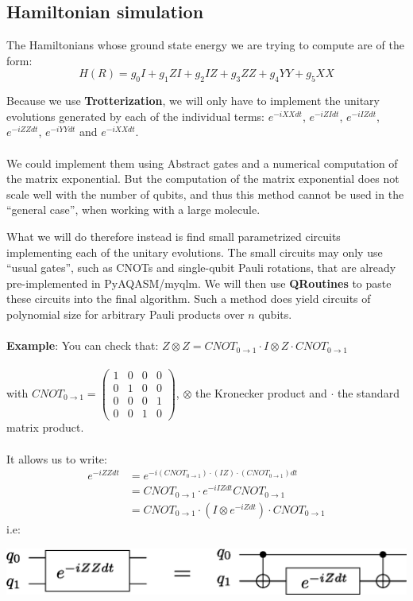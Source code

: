 \documentclass{article}
\begin{document}
\subsection{Hamiltonian simulation}

The Hamiltonians whose ground state energy we are trying to compute are of the form: 
$$H(R) = g_{0}I+g_{1}ZI+g_{2}IZ+g_{3}ZZ+g_{4}YY+g_{5}XX $$

Because we use \textbf{Trotterization}, we will only have
to implement the unitary evolutions generated by each of the
individual terms: $e^{-iXXdt}$, $e^{-iZIdt}$, 
$e^{-iIZdt}$, $e^{-iZZdt}$, $e^{-iYYdt}$ and $e^{-iXXdt}$.

\paragraph{}
We could implement them using Abstract gates and a numerical
computation of the matrix exponential. But the computation of the
matrix exponential does not scale well with the number of qubits, 
and thus this method cannot be used in the ``general case'', when
working with a large molecule.

What we will do therefore instead is find small parametrized circuits 
implementing each of the unitary evolutions. The small circuits
may only use ``usual gates'', such as CNOTs and single-qubit Pauli
rotations, that are already pre-implemented in PyAQASM/myqlm.
We will then use \textbf{QRoutines} to paste these circuits into
the final algorithm. Such a method does yield circuits of polynomial
size for arbitrary Pauli products over $n$ qubits.

\paragraph{}
\textbf{Example}:
You can check that: $Z\otimes Z = CNOT_{0\rightarrow 1} \cdot I\otimes Z \cdot CNOT_{0\rightarrow 1} $\\~\\
with $CNOT_{0\rightarrow 1}=\begin{pmatrix} 1 & 0 & 0 & 0 \\ 0 & 1 & 0 & 0 \\ 0 & 0 & 0 & 1 \\ 0 & 0 & 1 & 0 \end{pmatrix}$, $\otimes$
the Kronecker product and $\cdot$ the standard matrix product.\\~\\
It allows us to write: 
\begin{align*}
e^{-iZZdt} &= e^{-i(CNOT_{0\rightarrow 1})\cdot (IZ)\cdot (CNOT_{0\rightarrow 1})dt}\\ 
           &= CNOT_{0\rightarrow 1}\cdot e^{-iIZdt} CNOT_{0\rightarrow 1}\\
           &= CNOT_{0\rightarrow 1}\cdot \left(I\otimes e^{-iZdt}\right)\cdot CNOT_{0\rightarrow 1}
\end{align*}
i.e:
\begin{center}
\includegraphics[width=.5\textwidth]{zz_rz.eps}
\end{center}
\end{document}
